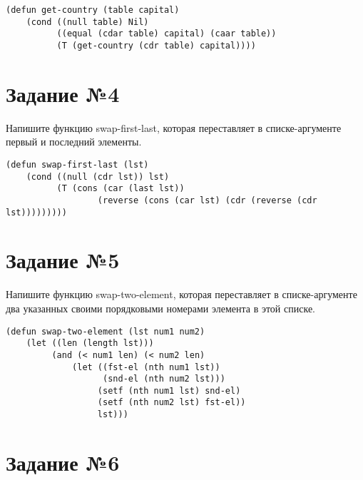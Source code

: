 \vspace{4mm}
\begin{minipage}{0.92\linewidth}
\begin{lstlisting}
(defun get-country (table capital)
    (cond ((null table) Nil)
          ((equal (cdar table) capital) (caar table))
          (T (get-country (cdr table) capital))))
\end{lstlisting}
\end{minipage}

\section{Задание №4}

Напишите функцию swap-first-last, которая переставляет в списке-аргументе
первый и последний элементы.

\vspace{4mm}
\begin{minipage}{0.92\linewidth}
\begin{lstlisting}
(defun swap-first-last (lst)
    (cond ((null (cdr lst)) lst)
          (T (cons (car (last lst))
                  (reverse (cons (car lst) (cdr (reverse (cdr lst)))))))))
\end{lstlisting}
\end{minipage}

\section{Задание №5}

Напишите функцию swap-two-element, которая переставляет в списке-аргументе
два указанных своими порядковыми номерами элемента в этой списке.

\vspace{4mm}
\begin{minipage}{0.92\linewidth}
\begin{lstlisting}
(defun swap-two-element (lst num1 num2)
    (let ((len (length lst)))
         (and (< num1 len) (< num2 len)
             (let ((fst-el (nth num1 lst))
                   (snd-el (nth num2 lst)))
                  (setf (nth num1 lst) snd-el)
                  (setf (nth num2 lst) fst-el))
                  lst)))
\end{lstlisting}
\end{minipage}

\section{Задание №6}

